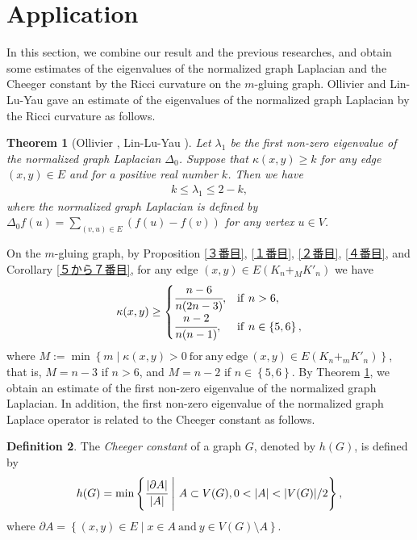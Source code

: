 \documentclass[leqno,12pt]{amsart} %
\theoremstyle{plain} %
\newtheorem{theorem}{\indent\sc Theorem}[section] %
\theoremstyle{definition} %
\newtheorem{definition}[theorem]{\indent\sc Definition}
\begin{document}
\section{Application}
In this section, we combine our result and the previous researches, and obtain some estimates of the eigenvalues of the normalized graph Laplacian and the Cheeger constant by the Ricci curvature on the $m$-gluing graph. Ollivier and Lin-Lu-Yau gave an estimate of the eigenvalues of the normalized graph Laplacian by the Ricci curvature as follows.
\begin{theorem}[Ollivier \cite{Ol1}, Lin-Lu-Yau \cite{Yau1}]
\label{Ol}
Let $\lambda_{1}$ be the first non-zero eigenvalue of the normalized graph Laplacian $\Delta_{0}$. Suppose that $\kappa(x, y) \geq k$ for any edge $(x, y) \in E$ and for a positive real number $k$. Then we have
	\begin{eqnarray*}
	k \leq \lambda_{1} \leq 2 - k,
	\end{eqnarray*}
	where the normalized graph Laplacian is defined by $\Delta_{0} f (u)= \sum_{(v, u) \in E} ( f(u) - f(v) )$ for any vertex $u \in V$.
\end{theorem}
On the $m$-gluing graph, by Proposition \ref{３番目}, \ref{１番目}, \ref{２番目}, \ref{４番目}, and Corollary \ref{５から７番目}, for any edge $(x,y) \in E(K_n +_M K'_n)$ we have 
\begin{eqnarray*}
\kappa(x, y) \geq 
\begin{cases}
\cfrac{n-6}{n(2n-3)}, & \mathrm{if}\ n >6,\\
\cfrac{n-2}{n(n-1)}, & \mathrm{if}\ n \in \left\{5, 6\right\},
\end{cases}
\end{eqnarray*}
where $M := \min \left\{ m \mid \kappa (x, y)>0\ \mathrm{for\ any\ edge}\ (x,y) \in E(K_n +_m K'_n) \right\}$, that is, $M=n-3$ if $n>6$, and $M=n-2$ if $n \in \left\{5, 6\right\}$. By Theorem \ref{Ol}, we obtain an estimate of the first non-zero eigenvalue of the normalized graph Laplacian. In addition, the first non-zero eigenvalue of the normalized graph Laplace operator is related to the Cheeger constant as follows.
\begin{definition}
The {\em Cheeger constant} of a graph $G$, denoted by $h(G)$, is defined by
\begin{eqnarray*}
h(G)=  \min \left\{ \cfrac{|\partial A|}{|A|}\ \middle|\ A \subset V(G), 0 < |A| < |V(G)|/2 \right\},
\end{eqnarray*}
where $\partial A = \left\{ (x, y) \in E \mid x \in A\ \mathrm{and}\ y \in V(G)\setminus A \right\}$.
\end{definition}
\end{document}
